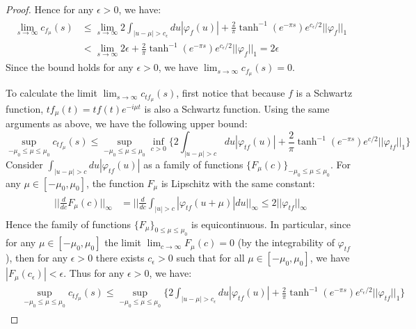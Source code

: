 \documentclass[a4paper,11pt]{article}
\theoremstyle{definition}
\begin{document}
\begin{proof}
    Hence for any $\epsilon > 0$, we have:
    \begin{align}
        \begin{split}
            \lim_{s\rightarrow\infty}c_{f_\mu}(s) &\leq \lim_{s\rightarrow\infty}2\int_{|u-\mu|>c_\epsilon}du|\varphi_f(u)| + \frac{2}{\pi}\tanh^{-1}(e^{-\pi s})e^{c_\epsilon/2}||\varphi_f||_1
            \\&
            <\lim_{s\rightarrow\infty}2\epsilon + \frac{2}{\pi}\tanh^{-1}(e^{-\pi s})e^{c_\epsilon/2}||\varphi_f||_1 = 2\epsilon
        \end{split}
    \end{align}
    Since the bound holds for any $\epsilon > 0$, we have $\lim_{s\rightarrow\infty}c_{f_\mu}(s) = 0$.

    To calculate the limit $\lim_{s\rightarrow\infty}c_{tf_\mu}(s)$, first notice that because $f$ is a Schwartz function, $tf_\mu(t) = tf(t)e^{-i\mu t}$ is also a Schwartz function. Using the same arguments as above, we have the following upper bound:
    \begin{equation}
        \sup_{-\mu_0\leq \mu\leq\mu_0}c_{tf_\mu}(s) \leq \sup_{-\mu_0\leq \mu\leq\mu_0}\inf_{c > 0}\{2\int_{|u - \mu| > c}du|\varphi_{tf}(u)|+ \frac{2}{\pi}\tanh^{-1}(e^{-\pi s})e^{c/2}||\varphi_{tf}||_1\}
    \end{equation}
    Consider $\int_{|u-\mu| > c}du|\varphi_{tf}(u)|$ as a family of functions $\{F_\mu(c)\}_{-\mu_0\leq\mu\leq\mu_0}$. For any $\mu \in [-\mu_0, \mu_0]$, the function $F_\mu$ is Lipschitz with the same constant:
    \begin{align}
        \begin{split}
            ||\frac{d}{dc}F_\mu(c)||_\infty &= ||\frac{d}{dc}\int_{|u| > c}|\varphi_{tf}(u + \mu)|du||_\infty \leq 2||\varphi_{tf}||_\infty
        \end{split}
    \end{align}
    Hence the family of functions $\{F_\mu\}_{0\leq \mu\leq \mu_0}$ is equicontinuous. In particular, since for any $\mu\in [-\mu_0, \mu_0]$ the limit $\lim_{c\rightarrow \infty}F_\mu(c) = 0$ (by the integrability of $\varphi_{tf}$), then for any $\epsilon > 0$ there exists $c_\epsilon > 0$ such that for all $\mu \in [-\mu_0, \mu_0]$, we have $|F_\mu(c_\epsilon)| < \epsilon$. Thus for any $\epsilon > 0$, we have:
    \begin{align}
        \begin{split}
            &\sup_{-\mu_0\leq \mu\leq \mu_0}c_{tf_\mu}(s) \leq \sup_{-\mu_0\leq \mu\leq\mu_0}\{2\int_{|u - \mu| > c_\epsilon} du |\varphi_{tf}(u)| + \frac{2}{\pi}\tanh^{-1}(e^{-\pi s})e^{c_\epsilon / 2}||\varphi_{tf}||_1\}

\end{split}
\end{align}
\end{proof}
\end{document}
